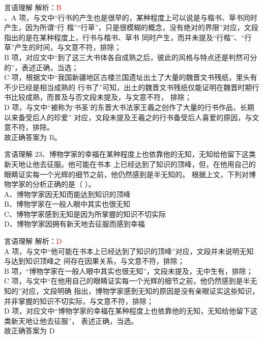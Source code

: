 \documentclass[aspectratio=169]{beamer}
\begin{document}
\begin{frame}[t]{言语理解}
    解析：\textcolor{red}{B}\\
    、A 项，与文中“行书的产生也是很早的，某种程度上可以说是与楷书、草书同时产生，因为所谓“行
楷”“行草”，只是很模糊的概念，没有绝对的界限”对应，文段指出的是在某种程度上，行书与楷书、草书
同时产生，而并未提及“行楷”、“行草”产生的时间，与文意不符，排除；\\
B 项，对应文中“到了这三大书体各自成熟之后，彼此的风格与特点还是判然可分的”，表述正确，当选；\\
C 项，根据文中“我国新疆地区古楼兰国遗址出土了大量的魏晋文书残纸，里头有不少已经是相当成熟的
行书了”可知，出土的魏晋文书残纸仅能证明在魏晋时期行书比较成熟，而普及与否文段未提及，与文意不符，
排除；\\
D 项，与文中“被称为‘书圣’的东晋大书法家王羲之创作了大量的行书作品，长期以来备受后人的珍爱”
对应，文段未提及王羲之的行书备受后人喜爱的原因，与文意不符，排除。\\
故正确答案为 B。\\
\end{frame}





\begin{frame}[t]{言语理解}
23、博物学家的幸福在某种程度上也依靠他的无知，无知给他留下这类新天地让他去征服。他可能在书本
上已经达到了知识的顶峰，但，在他用自己的眼睛证实每一个光辉的细节之前，他仍然感到是半无知的。
根据上文，下列对博物学家的分析正确的是（ ）。\\
A、博物学家因无知而能达到知识的顶峰\\
B、博物学家在一般人眼中其实也很无知\\
C、博物学家感到无知是因为所掌握的知识不切实际\\
D、博物学家因拥有新天地去征服而感到幸福\\
\end{frame}




\begin{frame}[t]{言语理解}
    解析：\textcolor{red}{D}\\
    A 项，与文中“他可能在书本上已经达到了知识的顶峰”对应，文段并未说明无知与达到知识顶峰之
间存在因果关系，与文意不符，排除；\\
B 项，“博物学家在一般人眼中其实也很无知”，文段未提及，无中生有，排除；\\
C 项，与文中“在他用自己的眼睛证实每一个光辉的细节之前，他仍然感到是半无知的”对应，文段明确
指出，博物学家感到无知的原因是没有亲眼证实这些知识，并非掌握的知识不切实际，与文意不符，排除；\\
D 项，对应文中“博物学家的幸福在某种程度上也依靠他的无知，无知给他留下这类新天地让他去征服”，
表述正确，当选。\\
故正确答案为 D\\
\end{frame}
\end{document}
